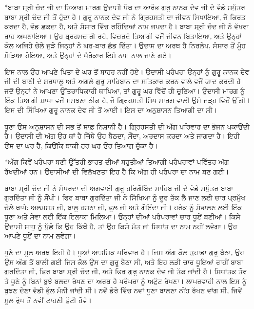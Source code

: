 \documentclass[12pt,a5paper,twoside]{book}  %
\makeatletter
\renewcommand\section{\@startsection{section}{1}{0pt}{1.2em}{0.6em}{\punjabifont\Large\bfseries}}%
\makeatother
\begin{document}
{\section*{ਬਾਬਾ ਸ੍ਰੀ ਚੰਦ ਜੀ ਦਾ ਤਿਆਗ ਮਾਰਗ}
ਉਦਾਸੀ ਪੰਥ ਦਾ ਆਰੰਭ ਗੁਰੂ ਨਾਨਕ ਦੇਵ ਜੀ ਦੇ ਵੱਡੇ ਸਪੁੱਤਰ ਬਾਬਾ ਸ੍ਰੀ ਚੰਦ ਜੀ ਤੋਂ ਹੁੰਦਾ ਹੈ। ਗੁਰੂ ਨਾਨਕ ਦੇਵ ਜੀ ਨੇ ਗ੍ਰਿਹਸਤੀ ਦਾ ਜੀਵਨ ਸਿਖਾਇਆ, ਜੋ ਕਿਰਤ ਕਰਦਾ ਹੈ, ਵੰਡ ਛਕਦਾ ਹੈ, ਅਤੇ ਸੰਸਾਰ ਵਿੱਚ ਰਹਿੰਦਿਆਂ ਨਾਮ ਜਪਦਾ ਹੈ। ਬਾਬਾ ਸ੍ਰੀ ਚੰਦ ਜੀ ਨੇ ਵੱਖਰਾ ਰਾਹ ਅਪਣਾਇਆ। ਉਹ ਬ੍ਰਹਮਚਾਰੀ ਰਹੇ, ਵਿਚਰਦੇ ਤਿਆਗੀ ਵਜੋਂ ਜੀਵਨ ਬਿਤਾਇਆ, ਅਤੇ ਉਨ੍ਹਾਂ ਕੋਲ ਅਜਿਹੇ ਚੇਲੇ ਜੁੜੇ ਜਿਨ੍ਹਾਂ ਨੇ ਘਰ-ਬਾਰ ਛੱਡ ਦਿੱਤਾ। ਉਦਾਸ ਦਾ ਅਰਥ ਹੈ ਨਿਰਲੇਪ, ਸੰਸਾਰ ਤੋਂ ਮੂੰਹ ਮੋੜਿਆ ਹੋਇਆ, ਅਤੇ ਉਨ੍ਹਾਂ ਦੇ ਪੈਰੋਕਾਰ ਇਸੇ ਨਾਮ ਨਾਲ ਜਾਣੇ ਗਏ।

ਇਸ ਨਾਲ ਉਹ ਆਪਣੇ ਪਿਤਾ ਦੇ ਘਰ ਤੋਂ ਬਾਹਰ ਨਹੀਂ ਹੋਏ। ਉਦਾਸੀ ਪਰੰਪਰਾ ਉਨ੍ਹਾਂ ਨੂੰ ਗੁਰੂ ਨਾਨਕ ਦੇਵ ਜੀ ਦੀ ਬਾਣੀ ਦੇ ਸ਼ਰਧਾਲੂ ਅਤੇ ਅਗਲੇ ਗੁਰੂ ਸਾਹਿਬਾਨ ਦਾ ਸਤਿਕਾਰ ਕਰਨ ਵਾਲੇ ਵਜੋਂ ਯਾਦ ਕਰਦੀ ਹੈ। ਜਦੋਂ ਉਨ੍ਹਾਂ ਨੇ ਆਪਣਾ ਉੱਤਰਾਧਿਕਾਰੀ ਥਾਪਿਆ, ਤਾਂ ਗੁਰੂ ਘਰ ਵਿੱਚੋਂ ਹੀ ਚੁਣਿਆ। ਉਦਾਸੀ ਮਾਰਗ ਨੂੰ ਇੱਕ ਤਿਆਗੀ ਸ਼ਾਖਾ ਵਜੋਂ ਸਮਝਣਾ ਠੀਕ ਹੈ, ਜੋ ਗ੍ਰਿਹਸਤੀ ਸਿੱਖ ਮਾਰਗ ਵਾਲੀ ਉਸੇ ਜੜ੍ਹ ਵਿੱਚੋਂ ਉੱਗੀ। ਇਸ ਦੀ ਸਿੱਖਿਆ ਗੁਰੂ ਨਾਨਕ ਦੇਵ ਜੀ ਤੋਂ ਆਈ। ਇਸ ਦਾ ਅਨੁਸ਼ਾਸਨ ਤਿਆਗੀ ਦਾ ਸੀ।

ਧੂਣਾ ਉਸ ਅਨੁਸ਼ਾਸਨ ਦੀ ਸਭ ਤੋਂ ਸਾਫ਼ ਨਿਸ਼ਾਨੀ ਹੈ। ਗ੍ਰਿਹਸਤੀ ਦੀ ਅੱਗ ਪਰਿਵਾਰ ਦਾ ਭੋਜਨ ਪਕਾਉਂਦੀ ਹੈ। ਉਦਾਸੀ ਦੀ ਅੱਗ ਉਹ ਥਾਂ ਹੈ ਜਿੱਥੇ ਉਹ ਬੈਠਦਾ, ਸੌਂਦਾ, ਅਰਦਾਸ ਕਰਦਾ ਅਤੇ ਜਾਗਦਾ ਹੈ। ਇਹੀ ਉਸ ਦਾ ਘਰ ਹੈ, ਕਿਉਂਕਿ ਬਾਕੀ ਹਰ ਘਰ ਉਹ ਤਿਆਗ ਚੁੱਕਾ ਹੈ।


\section*{ਅੱਗ ਕਿਵੇਂ ਪਰੰਪਰਾ ਬਣੀ}
ਉੱਤਰੀ ਭਾਰਤ ਦੀਆਂ ਬਹੁਤੀਆਂ ਤਿਆਗੀ ਪਰੰਪਰਾਵਾਂ ਪਵਿੱਤਰ ਅੱਗ ਰੱਖਦੀਆਂ ਹਨ। ਉਦਾਸੀਆਂ ਦੀ ਵਿਲੱਖਣਤਾ ਇਹ ਹੈ ਕਿ ਅੱਗ ਹੀ ਪਰੰਪਰਾ ਦਾ ਨਾਮ ਬਣ ਗਈ।

ਬਾਬਾ ਸ੍ਰੀ ਚੰਦ ਜੀ ਨੇ ਸੰਪਰਦਾ ਦੀ ਅਗਵਾਈ ਗੁਰੂ ਹਰਿਗੋਬਿੰਦ ਸਾਹਿਬ ਜੀ ਦੇ ਵੱਡੇ ਸਪੁੱਤਰ ਬਾਬਾ ਗੁਰਦਿੱਤਾ ਜੀ ਨੂੰ ਸੌਂਪੀ। ਫਿਰ ਬਾਬਾ ਗੁਰਦਿੱਤਾ ਜੀ ਨੇ ਸਿੱਖਿਆ ਨੂੰ ਦੂਰ ਤੱਕ ਲੈ ਜਾਣ ਲਈ ਚਾਰ ਪ੍ਰਮੁੱਖ ਚੇਲੇ ਥਾਪੇ: ਅਲਮਸਤ ਜੀ, ਬਾਲੂ ਹਸਨਾ ਜੀ, ਫੂਲ ਜੀ ਅਤੇ ਗੋਇੰਦਾ ਜੀ। ਹਰੇਕ ਨੂੰ ਸੰਭਾਲਣ ਲਈ ਇੱਕ ਧੂਣਾ ਅਤੇ ਸੇਵਾ ਲਈ ਇੱਕ ਇਲਾਕਾ ਮਿਲਿਆ। ਉਨ੍ਹਾਂ ਦੀਆਂ ਪਰੰਪਰਾਵਾਂ ਚਾਰ ਧੂਏਂ ਬਣੀਆਂ। ਕਿਸੇ ਉਦਾਸੀ ਸਾਧੂ ਨੂੰ ਪੁੱਛੋ ਕਿ ਉਹ ਕਿੱਥੋਂ ਹੈ, ਤਾਂ ਉਹ ਕਿਸੇ ਮੱਤ ਜਾਂ ਸਿਧਾਂਤ ਦਾ ਨਾਮ ਨਹੀਂ ਲਵੇਗਾ। ਉਹ ਆਪਣੇ ਧੂਏਂ ਦਾ ਨਾਮ ਲਵੇਗਾ।

ਧੂਣੇ ਦਾ ਮੂਲ ਅਰਥ ਇਹੀ ਹੈ। ਧੂਆਂ ਆਤਮਿਕ ਪਰਿਵਾਰ ਹੈ। ਜਿਸ ਅੱਗ ਕੋਲ ਤੁਹਾਡਾ ਗੁਰੂ ਬੈਠਾ, ਉਹ ਉਸ ਅੱਗ ਤੋਂ ਬਾਲੀ ਗਈ ਜਿਸ ਕੋਲ ਉਸ ਦਾ ਗੁਰੂ ਬੈਠਾ ਸੀ, ਅਤੇ ਇਹ ਲੜੀ ਚਾਰ ਧੂਇਆਂ ਰਾਹੀਂ ਬਾਬਾ ਗੁਰਦਿੱਤਾ ਜੀ, ਫਿਰ ਬਾਬਾ ਸ੍ਰੀ ਚੰਦ ਜੀ, ਅਤੇ ਫਿਰ ਗੁਰੂ ਨਾਨਕ ਦੇਵ ਜੀ ਤੱਕ ਜਾਂਦੀ ਹੈ। ਸਿਧਾਂਤਕ ਤੌਰ ਤੇ ਧੂਣੇ ਨੂੰ ਬਿਨਾਂ ਬੁਝੇ ਬਲਦਾ ਰੱਖਣ ਦਾ ਅਰਥ ਹੈ ਪਰੰਪਰਾ ਨੂੰ ਅਟੁੱਟ ਰੱਖਣਾ। ਲਾਪਰਵਾਹੀ ਨਾਲ ਇਸ ਨੂੰ ਬੁਝਣ ਦੇਣਾ ਵੱਡੀ ਭੁੱਲ ਮੰਨੀ ਜਾਂਦੀ ਸੀ। ਨਵੇਂ ਡੇਰੇ ਵਿੱਚ ਨਵਾਂ ਧੂਣਾ ਬਾਲਣਾ ਨੀਂਹ ਰੱਖਣ ਵਾਂਗ ਸੀ, ਜਿਵੇਂ ਮੂਲ ਰੁੱਖ ਤੋਂ ਨਵੀਂ ਟਾਹਣੀ ਫੁੱਟੀ ਹੋਵੇ।

}
\end{document}
